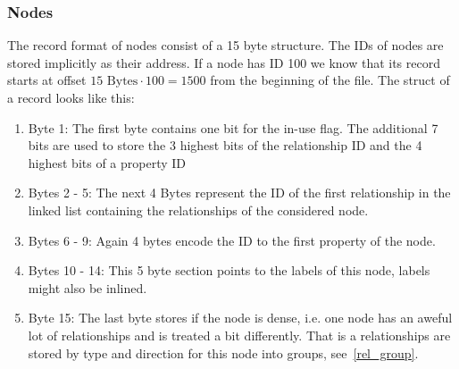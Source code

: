 \documentclass[a4paper,10pt]{article}
\begin{document}
    \subsubsection{Nodes}
    The record format of nodes consist of a 15 byte structure. The IDs of nodes are stored implicitly as their address. If a node has ID 100 we know that its record starts at offset $15 \text{ Bytes} \cdot 100 = 1500$ from the beginning of the file. The struct of a record looks like this:
    \begin{enumerate}
     \item Byte 1: The first byte contains one bit for the in-use flag. The additional 7 bits are used to store the 3 highest bits of the relationship ID and the 4 highest bits of a property ID
     \item Bytes 2 - 5: The next 4 Bytes represent the ID of the first relationship in the linked list containing the relationships of the considered node.
     \item Bytes 6 - 9: Again 4 bytes encode the ID to the first property of the node.
     \item Bytes 10 - 14: This 5 byte section points to the labels of this node, labels might also be inlined.
     \item Byte 15: The last byte stores if the node is dense, i.e. one node has an aweful lot of relationships and is treated a bit differently. That is a relationships are stored by type and direction for this node into groups, see~\ref{rel_group}.
    \end{enumerate}
    
\end{document}
